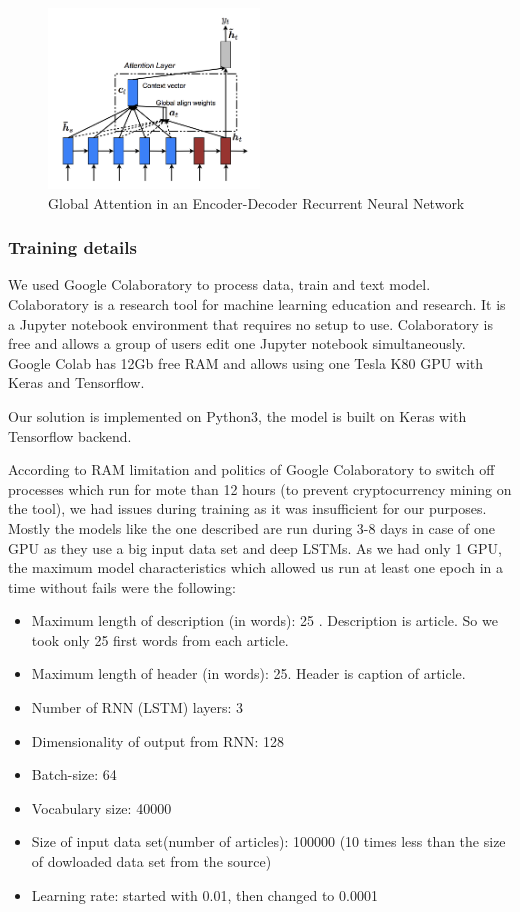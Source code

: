 \begin{figure}[h]
\centering
	\includegraphics[width=0.5\textwidth]{img/seq2seq-with-attention.png}
	\caption{\label{fig:attention}Global Attention in an Encoder-Decoder Recurrent Neural Network}
\end{figure}


\subsubsection{Training details}

We used Google Colaboratory to process data, train and text model. Colaboratory is a research tool for machine learning education and research. It is a Jupyter notebook environment that requires no setup to use. 
Colaboratory is free and allows a group of users edit one Jupyter notebook simultaneously. Google Colab has 12Gb free RAM and allows using one Tesla K80 GPU with Keras and Tensorflow.

Our solution is implemented on Python3, the model is built on Keras with Tensorflow backend. 

According to RAM limitation and politics of Google Colaboratory to switch off processes which run for mote than 12 hours (to prevent cryptocurrency mining on the tool), we had issues during training as it was insufficient for our purposes. Mostly the models like the one described are run during 3-8 days in case of one GPU as they use a big input data set and deep LSTMs. As we had only 1 GPU, the maximum model characteristics which allowed us run at least one epoch in a time without fails were the following:

\begin{itemize}
\setlength\itemsep{-0.1em}
\item Maximum length of description (in words): 25 . Description is article. So we took only 25 first words from each article. 
\item Maximum length of header (in words): 25. Header is caption of article.
\item Number of RNN (LSTM) layers: 3
\item Dimensionality of output from RNN: 128
\item Batch-size: 64
\item Vocabulary size: 40000
\item Size of input data set(number of articles): 100000 (10 times less than the size of dowloaded data set from the source)
\item Learning rate: started with 0.01, then changed to 0.0001
\end{itemize}


